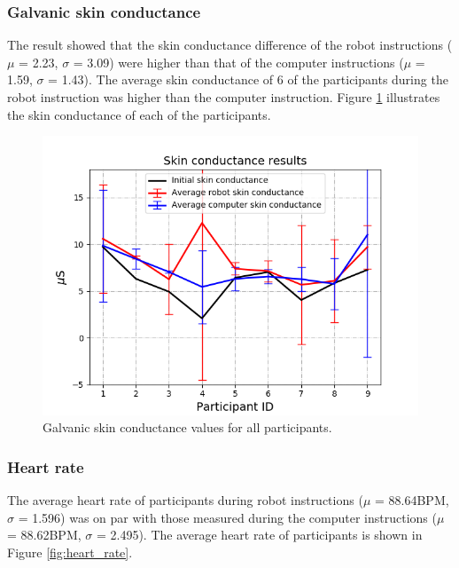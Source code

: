 \documentclass[conference]{IEEEtran}
\begin{document}
\subsubsection{Galvanic skin conductance} The result showed that the skin conductance difference of the robot instructions ($\mu$ = 2.23, $\sigma$ = 3.09) were higher than that of the computer instructions ($\mu$ = 1.59, $\sigma$ = 1.43). The average skin conductance of 6 of the participants during the robot instruction was higher than the computer instruction. Figure \ref{fig:skin_conductance} illustrates the skin conductance of each of the participants.

\begin{figure}[h]
	\flushleft 
	\includegraphics[width=1.05\linewidth]{figures/conductance.png}
	\caption{\label{fig:skin_conductance}Galvanic skin conductance values for all participants.}  
\end{figure}


\subsubsection{Heart rate} The average heart rate of participants during robot instructions ($\mu$ = 88.64BPM, $\sigma$ = 1.596) was on par with those measured during the computer instructions ($\mu$ = 88.62BPM, $\sigma$ = 2.495). The average heart rate of participants is shown in Figure \ref{fig:heart_rate}.
\end{document}
